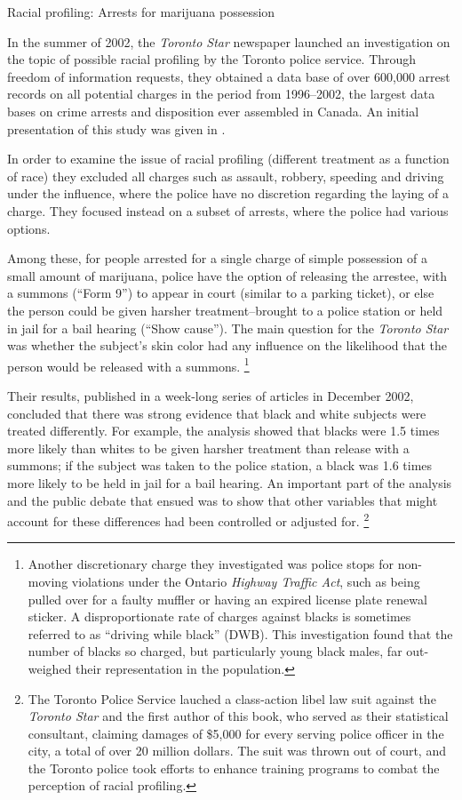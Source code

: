 \documentclass[11pt]{book}\usepackage[]{graphicx}\usepackage[]{color}
\begin{document}
\begin{Example}[arrests]{Racial profiling: Arrests for marijuana possession}

In the summer of 2002, the \emph{Toronto Star} newspaper launched an investigation
on the topic of possible racial profiling by the Toronto police service.
Through freedom of information requests, they obtained a data base of over
600,000 arrest records on all potential charges in the period from 
1996--2002, the largest data bases on crime arrests and disposition 
ever assembled in Canada. An initial presentation of this study was given in .

In order to examine the issue of racial profiling (different treatment as a function of race)
they excluded all charges such as assault,
robbery, speeding and driving under the influence, where the police have
no discretion regarding the laying of a charge. They focused instead on 
a subset of arrests, where the police had various options.

Among these, for people arrested for a single charge of
simple possession of a small amount of marijuana, police have the
option of releasing the arrestee, with a summons (``Form 9'') to appear in court
(similar to a parking ticket), or else the person could be given
harsher treatment--brought to a police station or held in jail
for a bail hearing (``Show cause'').  The main question for the \emph{Toronto Star}
was whether the subject's skin color had any influence on the 
likelihood that the person would be released with a summons.%
\footnote{
Another discretionary charge they investigated was police stops for non-moving violations
under the Ontario \emph{Highway Traffic Act}, such as being pulled over
for a faulty muffler or having an expired license plate renewal sticker.
A disproportionate rate of charges against blacks is sometimes referred to
as ``driving while black'' (DWB). This investigation found that the number of blacks
so charged, but particularly young black males, far out-weighed their representation
in the population.
}

Their results, published in a week-long series of articles in December 2002,
concluded that there was strong evidence that black and white subjects were
treated differently. For example, the analysis showed that blacks were
1.5 times more likely than whites to be given harsher treatment than release
with a summons; if the subject was taken to the police station, a black was
1.6 times more likely to be held in jail for a bail hearing. An important
part of the analysis and the public debate that ensued was to show that
other variables that might account for these differences had been controlled
or adjusted for.%
\footnote{
The Toronto Police Service lauched a class-action libel
law suit against the \emph{Toronto Star} and the first author of this
book, who served as their statistical consultant, claiming damages of 
\$5,000 for every serving police officer in the city, a total of over
20 million dollars.  The suit was thrown out of court, and the Toronto
police took efforts to enhance training programs to combat the perception of racial profiling.
}


\end{Example}
\end{document}

